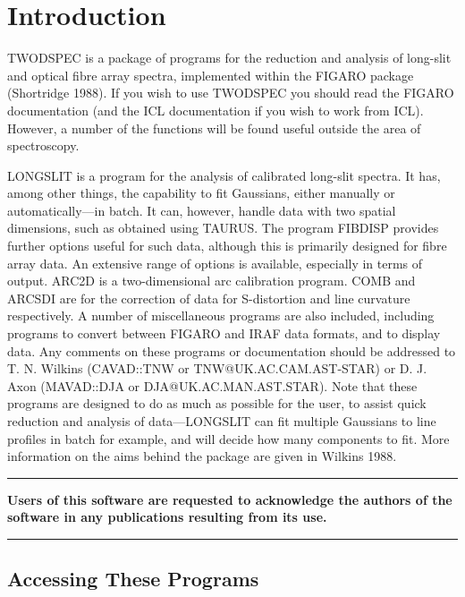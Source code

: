 \section{Introduction}

TWODSPEC is a package of programs for the reduction and analysis of
long-slit and optical fibre array spectra, implemented within the FIGARO
package (Shortridge 1988).
If you wish to use TWODSPEC you should read the FIGARO documentation
(and the ICL documentation if you wish to work from ICL).
However, a number of the functions will be found useful outside the area
of spectroscopy.

LONGSLIT is a program for the analysis of calibrated long-slit spectra.
It has, among other things, the capability to fit Gaussians, either
manually or automatically---in batch.
It can, however, handle data with two spatial dimensions, such as
obtained using TAURUS.
The program FIBDISP provides further options useful for such data,
although this is primarily designed for fibre array data.
An extensive range of options is available, especially in terms of
output.
ARC2D is a two-dimensional arc calibration program.
COMB and ARCSDI are for the correction of data for S-distortion and line
curvature respectively.
A number of miscellaneous programs are also included, including programs
to convert between FIGARO and IRAF data formats, and to display data.
Any comments on these programs or documentation should be addressed to
T. N. Wilkins (CAVAD::TNW or TNW@UK.AC.CAM.AST-STAR) or D. J. Axon
(MAVAD::DJA or DJA@UK.AC.MAN.AST.STAR).
Note that these programs are designed to do as much as possible for the
user, to assist quick reduction and analysis of data---LONGSLIT can fit
multiple Gaussians to line profiles in batch for example, and will
decide how many components to fit.
More information on the aims behind the package are given in Wilkins
1988.
\vspace*{3mm}
\rule{\textwidth}{0.5mm}
\begin{center}
{\large\bf Users of this software are requested to acknowledge the
authors of the software in any publications resulting from its use.}
\end{center}
\rule{\textwidth}{0.5mm}
\vspace*{3mm}

\subsection{Accessing These Programs}

